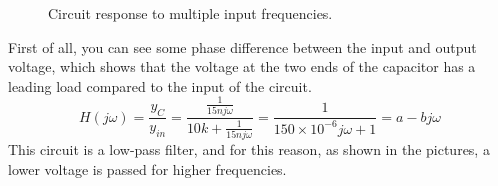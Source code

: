 \documentclass[11pt]{article}
\begin{document}
\begin{question}
\begin{subquestion}
{\begin{figure}[H]
                \caption{Circuit response to multiple input frequencies.}
            \end{figure}
            First of all, you can see some phase difference between the input and output voltage, which shows that the voltage at the two ends of the capacitor has a leading load compared to the input of the circuit.
            \[
                H(j\omega) = \frac{y_C}{y_{in}} = \frac{\frac{1}{15n j\omega}}{10k + \frac{1}{15n j\omega}} = \frac{1}{150 \times 10^{-6} j\omega + 1} = a - bj\omega
            \]
            This circuit is a low-pass filter, and for this reason, as shown in the pictures, a lower voltage is passed for higher frequencies.
        }
    \end{subquestion}


\end{question}

\end{document}
